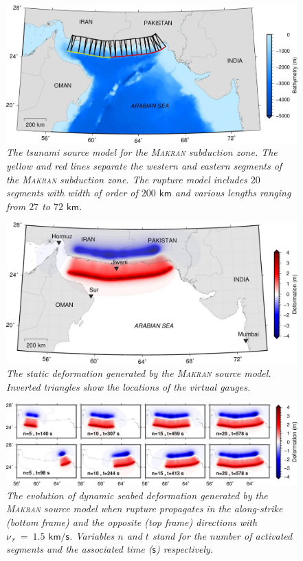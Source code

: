 \documentclass[12pt]{llncs}
\begin{document}
\begin{figure}
\centering
\includegraphics[scale=2.2]{Fig2.jpg}
\caption{\small\em The tsunami source model for the \textsc{Makran} subduction zone. The yellow and red lines separate the western and eastern segments of the \textsc{Makran} subduction zone. The rupture model includes $20$ segments with width of order of $200$ $\mathsf{km}$ and various lengths ranging from $27$ to $72$  $\mathsf{km}$.}
\label{fig:source}
\end{figure}

\begin{figure}
\centering
\includegraphics[scale=2.1]{Fig3.jpg}
\caption{\small\em The static deformation generated by the \textsc{Makran} source model. Inverted triangles show the locations of the virtual gauges.}
\label{fig:def_ini}
\end{figure}

\begin{figure}
\centering
\includegraphics[scale=2.1]{Fig4.jpg}
\caption{\small\em The evolution of dynamic seabed deformation generated by the \textsc{Makran} source model when rupture propagates in the along-strike (bottom frame) and the opposite (top frame) directions with $\nu_{\,r}\ =\ 1.5$ $\mathsf{km/s}$. Variables $n$ and $t$ stand for the number of activated segments and the associated time ($\mathsf{s}$) respectively.}
\label{fig:def_ini_dyn}
\end{figure}
\end{document}
